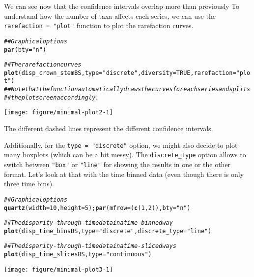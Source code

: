 \documentclass{article}\usepackage[]{graphicx}\usepackage[]{color}
\makeatletter
\newcommand{\hlnum}[1]{\textcolor[rgb]{0.686,0.059,0.569}{#1}}%
\newcommand{\hlstr}[1]{\textcolor[rgb]{0.192,0.494,0.8}{#1}}%
\newcommand{\hlcom}[1]{\textcolor[rgb]{0.678,0.584,0.686}{\textit{#1}}}%
\newcommand{\hlstd}[1]{\textcolor[rgb]{0.345,0.345,0.345}{#1}}%
\newcommand{\hlkwc}[1]{\textcolor[rgb]{0.333,0.667,0.333}{#1}}%
\newcommand{\hlkwd}[1]{\textcolor[rgb]{0.737,0.353,0.396}{\textbf{#1}}}%
\newenvironment{kframe}{%
 \def\at@end@of@kframe{}%
 \ifinner\ifhmode%
  \def\at@end@of@kframe{\end{minipage}}%
  \begin{minipage}{\columnwidth}%
 \fi\fi%
 \def\FrameCommand##1{\hskip\@totalleftmargin \hskip-\fboxsep
 \colorbox{shadecolor}{##1}\hskip-\fboxsep
     \hskip-\linewidth \hskip-\@totalleftmargin \hskip\columnwidth}%
 \MakeFramed {\advance\hsize-\width
   \@totalleftmargin\z@ \linewidth\hsize
   \@setminipage}}%
 {\par\unskip\endMakeFramed%
 \at@end@of@kframe}
\newenvironment{knitrout}{}{} %
\makeatother
\begin{document}
We can see now that the confidence intervals overlap more than previously
To understand how the number of taxa affects each series, we can use the \texttt{rarefaction = "plot"} function to plot the rarefaction curves.

\begin{knitrout}
\color{fgcolor}\begin{kframe}
\begin{alltt}
\hlcom{## Graphical options}
\hlkwd{par}\hlstd{(}\hlkwc{bty} \hlstd{=} \hlstr{"n"}\hlstd{)}

\hlcom{## The rarefaction curves}
\hlkwd{plot}\hlstd{(disp_crown_stemBS,} \hlkwc{type} \hlstd{=} \hlstr{"discrete"}\hlstd{,} \hlkwc{diversity} \hlstd{=} \hlnum{TRUE}\hlstd{,} \hlkwc{rarefaction} \hlstd{=} \hlstr{"plot"}\hlstd{)}
\hlcom{## Note that the function automatically draws the curves for each series and splits}
\hlcom{## the plot screen accordingly.}
\end{alltt}
\end{kframe}

{\centering \texttt{[image: figure/minimal-plot2-1]} 

}



\end{knitrout}

The different dashed lines represent the different confidence intervals.

Additionally, for the \texttt{type = "discrete"} option, we might also decide to plot many boxplots (which can be a bit messy).
The \texttt{discrete\_type} option allows to switch between \texttt{"box"} or \texttt{"line"} for showing the results in one or the other format.
Let's look at that with the time binned data (even though there is only three time bins).

\begin{knitrout}
\color{fgcolor}\begin{kframe}
\begin{alltt}
\hlcom{## Graphical options}
\hlkwd{quartz}\hlstd{(}\hlkwc{width} \hlstd{=} \hlnum{10}\hlstd{,} \hlkwc{height} \hlstd{=} \hlnum{5}\hlstd{) ;} \hlkwd{par}\hlstd{(}\hlkwc{mfrow} \hlstd{= (}\hlkwd{c}\hlstd{(}\hlnum{1}\hlstd{,}\hlnum{2}\hlstd{)),} \hlkwc{bty} \hlstd{=} \hlstr{"n"}\hlstd{)}

\hlcom{## The disparity-through-time data in a time-binned way}
\hlkwd{plot}\hlstd{(disp_time_binsBS,} \hlkwc{type} \hlstd{=} \hlstr{"discrete"}\hlstd{,} \hlkwc{discrete_type} \hlstd{=} \hlstr{"line"}\hlstd{)}

\hlcom{## The disparity-through-time data in a time-sliced ways}
\hlkwd{plot}\hlstd{(disp_time_slicesBS,} \hlkwc{type} \hlstd{=} \hlstr{"continuous"}\hlstd{)}
\end{alltt}
\end{kframe}

{\centering \texttt{[image: figure/minimal-plot3-1]} 

}



\end{knitrout}
\end{document}
